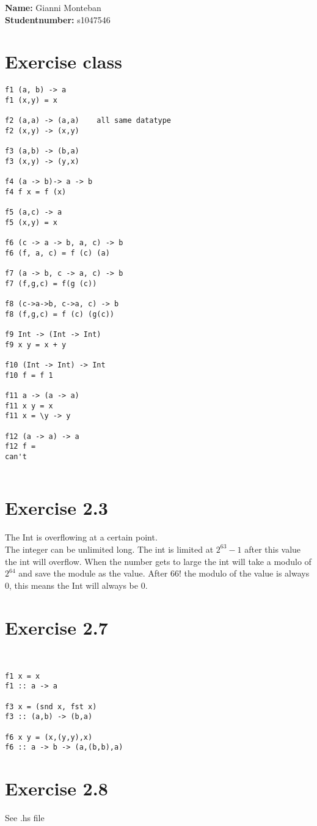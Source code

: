 \documentclass[12pt,a4paper]{report}
\begin{document}
\textbf{Name:} Gianni Monteban \\
\textbf{Studentnumber:} s1047546

\section{Exercise class}
\begin{verbatim}
f1 (a, b) -> a
f1 (x,y) = x

f2 (a,a) -> (a,a)    all same datatype
f2 (x,y) -> (x,y)

f3 (a,b) -> (b,a)
f3 (x,y) -> (y,x)

f4 (a -> b)-> a -> b
f4 f x = f (x)

f5 (a,c) -> a
f5 (x,y) = x

f6 (c -> a -> b, a, c) -> b
f6 (f, a, c) = f (c) (a)

f7 (a -> b, c -> a, c) -> b
f7 (f,g,c) = f(g (c))

f8 (c->a->b, c->a, c) -> b
f8 (f,g,c) = f (c) (g(c))

f9 Int -> (Int -> Int)
f9 x y = x + y

f10 (Int -> Int) -> Int
f10 f = f 1

f11 a -> (a -> a)
f11 x y = x
f11 x = \y -> y

f12 (a -> a) -> a
f12 f = 
can't


\end{verbatim}

\section{Exercise 2.3}
The Int is overflowing at a certain point. \\
The integer can be unlimited long. The int is limited at $2^{63} - 1$ after this value the int will overflow. When the number gets to large the int will take a modulo of $2^{64}$ and save the module as the value. After $66!$ the modulo of the value is always 0, this means the Int will always be 0.


\section{Exercise 2.7}
\begin{verbatim}


f1 x = x
f1 :: a -> a 

f3 x = (snd x, fst x)  
f3 :: (a,b) -> (b,a)

f6 x y = (x,(y,y),x)
f6 :: a -> b -> (a,(b,b),a)
\end{verbatim}

\section{Exercise 2.8}

See .hs file
\end{document}
